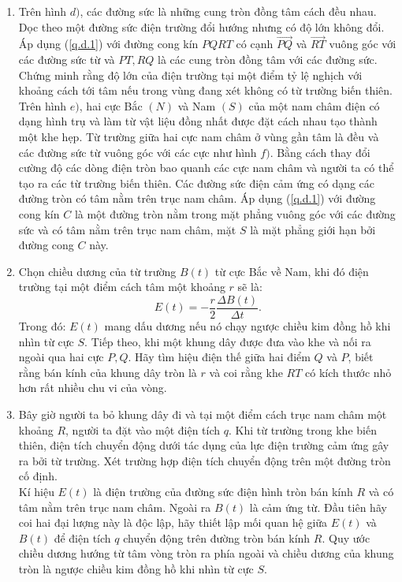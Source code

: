 \begin{vd}
\begin{enumerate}[1)]
    \item Trên hình $d)$, các đường sức là những cung tròn đồng tâm cách đều nhau. Dọc theo một đường sức điện trường đổi hướng nhưng có độ lớn không đổi. Áp dụng (\ref{q.d.1}) với đường cong kín $PQRT$ có cạnh $\overrightarrow{PQ}$ và $\overrightarrow{RT}$ vuông góc với các đường sức từ và ${PT},{RQ}$ là các cung tròn đồng tâm với các đường sức. Chứng minh rằng độ lớn của điện trường tại một điểm tỷ lệ nghịch với khoảng cách tới tâm nếu trong vùng đang xét không có từ trường biến thiên.\\
    Trên hình $e)$, hai cực Bắc $(N)$ và Nam $(S)$ của một nam châm điện có dạng hình trụ và làm từ vật liệu đồng nhất được đặt cách nhau tạo thành một khe hẹp. Từ trường giữa hai cực nam châm ở vùng gần tâm là đều và các đường sức từ vuông góc với các cực như hình $f)$. Bằng cách thay đổi cường độ các dòng điện tròn bao quanh các cực nam châm và người ta có thể tạo ra các từ trường biến thiên. Các đường sức điện cảm ứng có dạng các đường tròn có tâm nằm trên trục nam châm. Áp dụng (\ref{q.d.1}) với đường cong kín ${C}$ là một đường tròn nằm trong mặt phẳng vuông góc với các đường sức và có tâm nằm trên trục nam châm, mặt ${S}$ là mặt phẳng giới hạn bởi đường cong ${C}$ này.
    \item Chọn chiều dương của từ trường ${B}({t})$ từ cực Bắc về Nam, khi đó điện trường tại một điểm cách tâm một khoảng ${r}$ sẽ là:
\[E({t})=-\dfrac{r}{2} \dfrac{\Delta B({t})}{\Delta t}.\tag{2}\label{q.d.2}\]
Trong đó: ${E}({t})$ mang dấu dương nếu nó chạy ngược chiều kim đồng hồ khi nhìn từ cực ${S}$. Tiếp theo, khi một khung dây được đưa vào khe và nối ra ngoài qua hai cực ${P}, {Q}$. Hãy tìm hiệu điện thế giữa hai điểm $Q$ và $P$, biết rằng bán kính của khung dây tròn là $r$ và coi rằng khe $RT$ có kích thước nhỏ hơn rất nhiều chu vi của vòng.
\item Bây giờ người ta bỏ khung dây đi và tại một điểm cách trục nam châm một khoảng $R$, người ta đặt vào một điện tích $q$. Khi từ trường trong khe biến thiên, điện tích chuyển động dưới tác dụng của lực điện trường cảm ứng gây ra bởi từ trường. Xét trường hợp điện tích chuyển động trên một đường tròn cố định.\\
Kí hiệu ${E}({t})$ là điện trường của đường sức điện hình tròn bán kính ${R}$ và có tâm nằm trên trục nam châm. Ngoài ra ${B}({t})$ là cảm ứng từ. Đầu tiên hãy coi hai đại lượng này là độc lập, hãy thiết lập mối quan hệ giữa ${E}({t})$ và ${B}({t})$ để điện tích $q$ chuyển động trên đường tròn bán kính $R$. Quy ước chiều dương hướng từ tâm vòng tròn ra phía ngoài và chiều dương của khung tròn là ngược chiều kim đồng hồ khi nhìn từ cực ${S}$.\\

\end{enumerate}
\end{vd}
